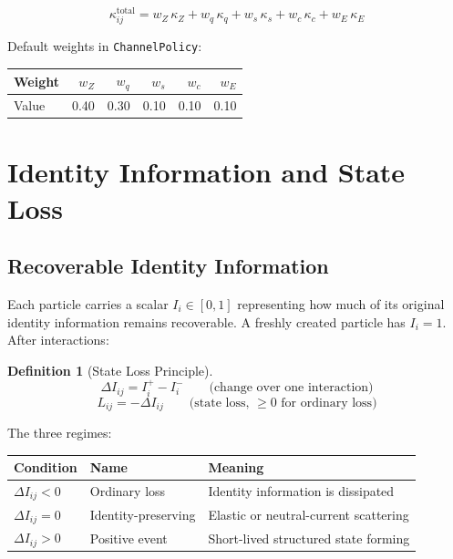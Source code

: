 \documentclass[11pt,a4paper]{article}
\theoremstyle{defbox}
\newtheorem{definition}{Definition}
\begin{document}
\begin{equation}
  \boxed{
	\kappa_{ij}^{\mathrm{total}}
	= w_Z\,\kappa_Z
	+ w_q\,\kappa_q
	+ w_s\,\kappa_s
	+ w_c\,\kappa_c
	+ w_E\,\kappa_E
  }
\end{equation}

Default weights in \texttt{ChannelPolicy}:

\begin{center}
\begin{tabular}{lrrrrr}
\toprule
Weight & $w_Z$ & $w_q$ & $w_s$ & $w_c$ & $w_E$ \\
\midrule
Value  & 0.40  & 0.30  & 0.10  & 0.10  & 0.10  \\
\bottomrule
\end{tabular}
\end{center}

\section{Identity Information and State Loss}
\label{sec:identity}

\subsection{Recoverable Identity Information}

Each particle carries a scalar $I_i \in [0, 1]$ representing how much of its
original identity information remains recoverable.  A freshly created particle
has $I_i = 1$.  After interactions:

\begin{definition}[State Loss Principle]
\begin{equation}
  \Delta I_{ij} = I_i^+ - I_i^-
  \qquad \text{(change over one interaction)}
\end{equation}
\begin{equation}
  L_{ij} = -\Delta I_{ij}
  \qquad \text{(state loss, } \geq 0 \text{ for ordinary loss)}
\end{equation}
\end{definition}

The three regimes:

\begin{center}
\renewcommand{\arraystretch}{1.3}
\begin{tabular}{lll}
\toprule
\textbf{Condition} & \textbf{Name} & \textbf{Meaning} \\
\midrule
$\Delta I_{ij} < 0$ & Ordinary loss       & Identity information is dissipated \\
$\Delta I_{ij} = 0$ & Identity-preserving & Elastic or neutral-current scattering \\
$\Delta I_{ij} > 0$ & Positive event      & Short-lived structured state forming \\
\bottomrule
\end{tabular}
\end{center}
\end{document}
